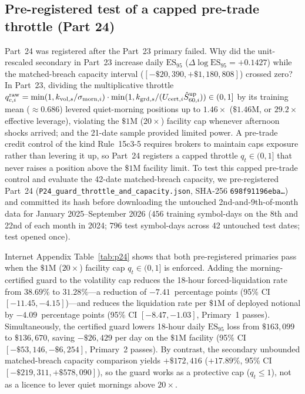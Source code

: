 \documentclass[12pt]{article}
\theoremstyle{definition}
\theoremstyle{remark}
\begin{document}
\subsection{Pre-registered test of a capped pre-trade throttle (Part 24)}\label{sec:p24}
Part~24 was registered after the Part~23 primary failed. Why did the unit-rescaled secondary in Part~23 increase daily $\mathrm{ES}_{95}$ ($\Delta\log\mathrm{ES}_{95}=+0.1427$) while the matched-breach capacity interval ($[-\$20{,}390,+\$1{,}180{,}808]$) crossed zero? In Part~23, dividing the multiplicative throttle $q^{\rm raw}_{c,i}=\min(1,k_{{\rm vol},s}/\sigma_{{\rm morn},i})\cdot\min(1,k_{{\rm grd},s}/(U_{{\rm cert},i}\hat S^{\rm up}_{60,i}))\in(0,1]$ by its training mean ($\approx0.686$) levered quiet-morning positions up to $1.46\times$ ($\$1.46\text{M}$, or $29.2\times$ effective leverage), violating the $\$1\text{M}$ ($20\times$) facility cap whenever afternoon shocks arrived; and the 21-date sample provided limited power. A pre-trade credit control of the kind Rule~15c3-5 requires brokers to maintain caps exposure rather than levering it up, so Part~24 registers a capped throttle $q_t\in(0,1]$ that never raises a position above the $\$1\text{M}$ facility limit. To test this capped pre-trade control and evaluate the 42-date matched-breach capacity, we pre-registered Part~24 (\texttt{P24\_guard\_throttle\_and\_capacity.json}, SHA-256 \texttt{698f91196eba\ldots}) and committed its hash before downloading the untouched 2nd-and-9th-of-month data for January 2025--September 2026 ($456$ training symbol-days on the 8th and 22nd of each month in 2024; $796$ test symbol-days across 42 untouched test dates; test opened once).



Internet Appendix Table~\ref{tab:p24} shows that both pre-registered primaries pass when the $\$1\text{M}$ ($20\times$) facility cap $q_t\in(0,1]$ is enforced. Adding the morning-certified guard to the volatility cap reduces the 18-hour forced-liquidation rate from $38.69\%$ to $31.28\%$---a reduction of $-7.41$~percentage points (95\% CI $[-11.45,-4.15]$)---and reduces the liquidation rate per $\$1\text{M}$ of deployed notional by $-4.09$~percentage points (95\% CI $[-8.47,-1.03]$, Primary~1 passes). Simultaneously, the certified guard lowers 18-hour daily $\mathrm{ES}_{95}$ loss from $\$163{,}099$ to $\$136{,}670$, saving $-\$26{,}429$ per day on the $\$1\text{M}$ facility (95\% CI $[-\$53{,}146,-\$6{,}254]$, Primary~2 passes). By contrast, the secondary unbounded matched-breach capacity comparison yields $+\$172{,}416$ ($+17.89\%$, 95\% CI $[-\$219{,}311,+\$578{,}090]$), so the guard works as a protective cap ($q_t\le 1$), not as a licence to lever quiet mornings above $20\times$.
\end{document}
